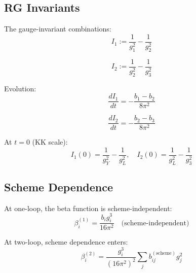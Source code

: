 \documentclass[11pt,a4paper]{article}
\theoremstyle{definition}
\begin{document}
\subsection{RG Invariants}
\label{subsec:rg_invariants}

The gauge-invariant combinations:
\begin{equation}
\label{eq:rg_inv_1}
I_1 := \frac{1}{g_1^2} - \frac{1}{g_2^2}
\end{equation}

\begin{equation}
\label{eq:rg_inv_2}
I_2 := \frac{1}{g_2^2} - \frac{1}{g_3^2}
\end{equation}

Evolution:
\begin{equation}
\label{eq:I1_evolution}
\frac{dI_1}{dt} = -\frac{b_1 - b_2}{8\pi^2}
\end{equation}

\begin{equation}
\label{eq:I2_evolution}
\frac{dI_2}{dt} = -\frac{b_2 - b_3}{8\pi^2}
\end{equation}

At $t = 0$ (KK scale):
\begin{equation}
\label{eq:I_at_KK}
I_1(0) = \frac{1}{g_Y^2} - \frac{1}{g_L^2}, \quad I_2(0) = \frac{1}{g_L^2} - \frac{1}{g_3^2}
\end{equation}

\subsection{Scheme Dependence}
\label{subsec:scheme}

At one-loop, the beta function is scheme-independent:
\begin{equation}
\label{eq:beta_scheme}
\beta_i^{(1)} = \frac{b_i g_i^3}{16\pi^2} \quad \text{(scheme-independent)}
\end{equation}

At two-loop, scheme dependence enters:
\begin{equation}
\label{eq:beta_2loop}
\beta_i^{(2)} = \frac{g_i^3}{(16\pi^2)^2} \sum_j b_{ij}^{(\text{scheme})} g_j^2
\end{equation}
\end{document}

